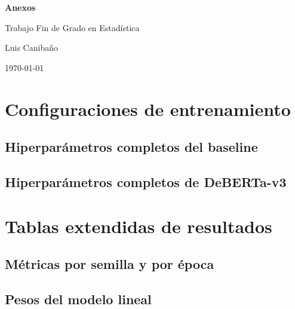 \documentclass[12pt,a4paper,oneside]{report}
\begin{document}
\begin{titlepage}
  \centering
  \vspace*{4cm}
  {\Huge\bfseries Anexos\par}
  \vspace{1cm}
  {\Large Trabajo Fin de Grado en Estadística\par}
  \vspace{0.5cm}
  {\large Luis Caniba\~no\par}
  \vfill
  {\large \today\par}
\end{titlepage}

\tableofcontents
\clearpage

\chapter{Configuraciones de entrenamiento}

\section{Hiperparámetros completos del baseline}


\section{Hiperparámetros completos de DeBERTa-v3}


\chapter{Tablas extendidas de resultados}

\section{Métricas por semilla y por época}


\section{Pesos del modelo lineal}

\end{document}
